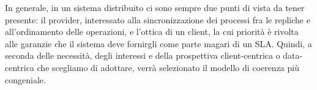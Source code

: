 \documentclass[twoside]{article}
\begin{document}
\begin{multicols}{2}
In generale, in un sistema distribuito ci sono sempre due punti di vista da tener presente: il provider, interessato alla sincronizzazione dei processi fra le repliche e all'ordinamento delle operazioni, e l'ottica di un client, la cui priorità è rivolta alle garanzie che il sistema deve fornirgli come parte magari di un SLA. Quindi, a seconda delle necessità, degli interessi e della prospettiva client-centrica o data-centrica che scegliamo di adottare, verrà selezionato il modello di coerenza più congeniale.

\label{sec:conclusioni}


 

\printbibliography


\end{multicols}
\end{document}
